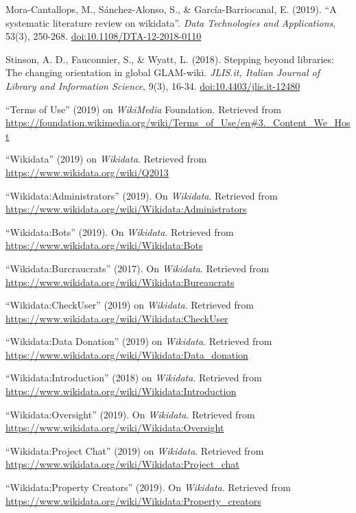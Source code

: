 \documentclass[]{article}
\begin{document}
Mora-Cantallops, M., Sánchez-Alonso, S., \& García-Barriocanal, E.
(2019). ``A systematic literature review on wikidata''. \emph{Data
Technologies and Applications}, 53(3), 250-268.
\url{doi:10.1108/DTA-12-2018-0110}

Stinson, A. D., Fauconnier, S., \& Wyatt, L. (2018). Stepping beyond
libraries: The changing orientation in global GLAM-wiki. \emph{JLIS.it,
Italian Journal of Library and Information Science}, 9(3), 16-34.
\url{doi:10.4403/jlis.it-12480}

``Terms of Use'' (2019) on \emph{WikiMedia} Foundation. Retrieved from
\url{https://foundation.wikimedia.org/wiki/Terms_of_Use/en\#3._Content_We_Host}

``Wikidata'' (2019) on \emph{Wikidata}. Retrieved from
\url{https://www.wikidata.org/wiki/Q2013}

``Wikidata:Administrators'' (2019). On \emph{Wikidata}. Retrieved from
\url{https://www.wikidata.org/wiki/Wikidata:Administrators}

``Wikidata:Bots'' (2019). On \emph{Wikidata}. Retrieved from
\url{https://www.wikidata.org/wiki/Wikidata:Bots}

``Wikidata:Burcraucrats'' (2017). On \emph{Wikidata}. Retrieved from
\url{https://www.wikidata.org/wiki/Wikidata:Bureaucrats}

``Wikidata:CheckUser'' (2019) on \emph{Wikidata}. Retrieved from
\url{https://www.wikidata.org/wiki/Wikidata:CheckUser}

``Wikidata:Data Donation'' (2019) on \emph{Wikidata}. Retrieved from
\url{https://www.wikidata.org/wiki/Wikidata:Data_donation}

``Wikidata:Introduction'' (2018) on \emph{Wikidata}. Retrieved from
\url{https://www.wikidata.org/wiki/Wikidata:Introduction}

``Wikidata:Oversight'' (2019). On \emph{Wikidata}. Retrieved from
\url{https://www.wikidata.org/wiki/Wikidata:Oversight}

``Wikidata:Project Chat'' (2019) on \emph{Wikidata}. Retrieved from
\url{https://www.wikidata.org/wiki/Wikidata:Project_chat}

``Wikidata:Property Creators'' (2019). On \emph{Wikidata}. Retrieved
from \url{https://www.wikidata.org/wiki/Wikidata:Property_creators}
\end{document}
